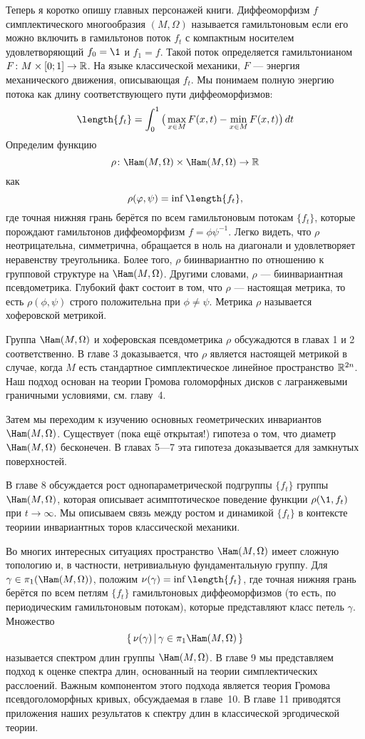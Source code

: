 Теперь я коротко опишу главных персонажей книги.
Диффеоморфизм $f$ симплектического многообразия $(M,\Omega)$
называется гамильтоновым если его можно включить в гамильтонов поток
$f_t$ с компактным носителем удовлетворяющий $f_0=\1$ и $f_1 =f$.
Такой поток определяется гамильтонианом $F\colon M \times [0;1] \to \mathbb{R}$.
На языке классической механики, $F$ — энергия механического движения, описывающая $f_t$.
Мы понимаем полную энергию потока как длину соответствующего пути диффеоморфизмов:
\[\length \{f_t\} =
\int_0^1\big(\max_{x\in M}F(x,t)-\min_{x\in M}F(x,t)\big)\, dt 
\]%
Определим функцию
\[\rho\: \Ham(M,\Omega) \times \Ham(M,\Omega) \to \RR\]
как
\[\rho (\phi, \psi) = \inf \length \{f_t\},\]
где точная нижняя грань берётся по всем гамильтоновым потокам $\{f_t\}$, которые
порождают гамильтонов диффеоморфизм $f = \phi\psi^{-1}$.
Легко видеть, что $\rho$ неотрицательна, симметрична, обращается в ноль на диагонали и удовлетворяет неравенству треугольника.
Более того, $\rho$ биинвариантно по отношению к групповой структуре на $\Ham(M,\Omega)$.
Другими словами, $\rho$ — биинвариантная псевдометрика.
Глубокий факт состоит в том, что $\rho$ — настоящая метрика, то есть $\rho (\phi, \psi)$ строго положительна при $\phi \ne \psi$.
Метрика $\rho$ называется хоферовской метрикой.

Группа $\Ham(M,\Omega)$ и хоферовская псевдометрика $\rho$ обсужадются в главах 1 и 2 соответственно.
В главе 3 доказывается, что $\rho$ является настоящей метрикой в случае, когда $M$ есть стандартное симплектическое линейное пространство $\mathbb{R}^{2n}$.
Наш подход основан на теории Громова голоморфных дисков с лагранжевыми граничными условиями, см.
главу~4.

Затем мы переходим к изучению основных геометрических инвариантов $\Ham(M,\Omega)$.
Существует (пока ещё открытая!) гипотеза о том, что диаметр $\Ham(M,\Omega)$ бесконечен.
В главах 5—7 эта гипотеза доказывается для замкнутых поверхностей.

В главе 8 обсуждается рост однопараметрической подгруппы $\{f_t\}$ группы $\Ham(M,\Omega)$, которая описывает асимптотическое поведение функции $\rho (\1, f_t)$ при $t \to \infty$.
Мы описываем связь между ростом и динамикой $\{f_t\}$ в контексте
теориии инвариантных торов классической механики.

Во многих интересных ситуациях пространство $\Ham(M,\Omega)$ имеет сложную топологию и, в частности, нетривиальную фундаментальную группу.
Для $\gamma\in\pi_1(\Ham(M,\Omega))$, положим $\nu(\gamma) \z= \inf \length \{f_t\}$, где
точная нижняя грань берётся по всем петлям $\{f_t\}$ гамильтоновых
диффеоморфизмов (то есть, по периодическим гамильтоновым потокам),
которые представляют класс петель $\gamma$.
Множество
\[\set{\nu(\gamma)}{\gamma\in\pi_{1}\Ham(M,\Omega)}\]
называется спектром длин группы $\Ham(M,\Omega)$.
В главе 9 мы представляем подход к оценке спектра длин, основанный на
теории симплектических расслоений. 
Важным компонентом этого подхода является теория Громова
псевдоголоморфных кривых, обсуждаемая в главе~10. 
В главе 11 приводятся приложения наших результатов к спектру длин в
классической эргодической теории.

